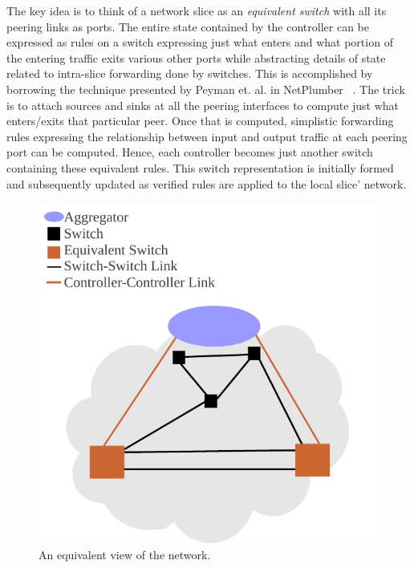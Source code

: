 \documentclass[conference]{IEEEtran}
\begin{document}
The key idea is to think of a network slice as an \textit{equivalent switch} with all its peering links as ports. The entire state contained by the controller can be expressed as rules on a switch expressing just what enters and what portion of the entering traffic exits various other ports while abstracting details of state related to intra-slice forwarding done by switches. This is accomplished by borrowing the technique presented by Peyman et. al. in NetPlumber ~\cite{netplumber}. The trick is to attach sources and sinks at all the peering interfaces to compute just what enters/exits that particular peer. Once that is computed, simplistic forwarding rules expressing the relationship between input and output traffic at each peering port can be computed.  Hence, each controller becomes just another switch containing these equivalent rules. This switch representation is initially formed and subsequently updated as verified rules are applied to the local slice' network.


 \begin{figure}[h]
 \centering
 \includegraphics[scale=0.8]{alternative_network_view}
 \caption{An equivalent view of the network.}
 \label{fig:alternative_network_view}
 \end{figure}
\end{document}
